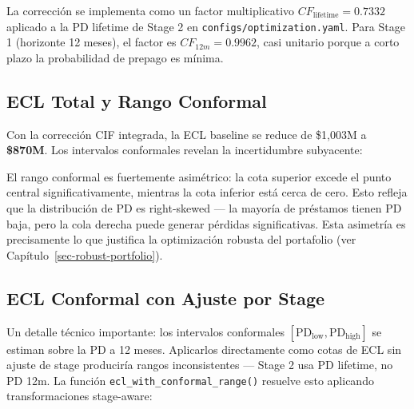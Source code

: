 \documentclass[
  spanish,
  11pt,
  letterpaper,
]{scrbook}
\theoremstyle{plain}
\theoremstyle{remark}
\begin{document}
La corrección se implementa como un factor multiplicativo
\(CF_{\text{lifetime}} = 0.7332\) aplicado a la PD lifetime de Stage 2
en \texttt{configs/optimization.yaml}. Para Stage 1 (horizonte 12
meses), el factor es \(CF_{12m} = 0.9962\), casi unitario porque a corto
plazo la probabilidad de prepago es mínima.

\subsection{ECL Total y Rango
Conformal}\label{ecl-total-y-rango-conformal}

Con la corrección CIF integrada, la ECL baseline se reduce de \$1,003M a
\textbf{\$870M}. Los intervalos conformales revelan la incertidumbre
subyacente:

\begin{tcolorbox}[enhanced jigsaw, arc=.35mm, bottomrule=.15mm, bottomtitle=1mm, breakable, colback=white, colbacktitle=quarto-callout-warning-color!10!white, colframe=quarto-callout-warning-color-frame, coltitle=black, left=2mm, leftrule=.75mm, opacityback=0, opacitybacktitle=0.6, rightrule=.15mm, title=\textcolor{quarto-callout-warning-color}{\faExclamationTriangle}\hspace{0.5em}{Asimetría del Rango ECL}, titlerule=0mm, toprule=.15mm, toptitle=1mm]

El rango conformal es fuertemente asimétrico: la cota superior excede el
punto central significativamente, mientras la cota inferior está cerca
de cero. Esto refleja que la distribución de PD es right-skewed --- la
mayoría de préstamos tienen PD baja, pero la cola derecha puede generar
pérdidas significativas. Esta asimetría es precisamente lo que justifica
la optimización robusta del portafolio (ver
Capítulo~\ref{sec-robust-portfolio}).

\end{tcolorbox}

\subsection{ECL Conformal con Ajuste por
Stage}\label{sec-ecl-conformal-staging}

Un detalle técnico importante: los intervalos conformales
\([\text{PD}_\text{low}, \text{PD}_\text{high}]\) se estiman sobre la PD
a 12 meses. Aplicarlos directamente como cotas de ECL sin ajuste de
stage produciría rangos inconsistentes --- Stage 2 usa PD lifetime, no
PD 12m. La función \texttt{ecl\_with\_conformal\_range()} resuelve esto
aplicando transformaciones stage-aware:
\end{document}
